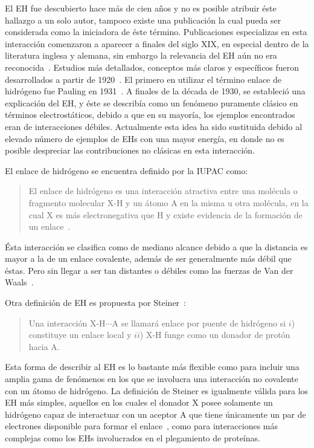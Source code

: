 El EH fue descubierto hace más de cien años y no es posible atribuir éste
hallazgo a un solo autor, tampoco existe una publicación la cual pueda ser
considerada como la iniciadora de éste término. Publicaciones especializas en
esta interacción comenzaron a aparecer a finales del siglo XIX, en especial
dentro de la literatura inglesa y alemana, sin embargo la relevancia del EH aún
no era reconocida~\cite{steiner}. Estudios más detallados, conceptos más claros
y específicos fueron desarrollados a partir de 1920~\cite{steiner}. El primero
en utilizar el término enlace de hidrógeno fue Pauling en 1931~\cite{gilli}.  A
finales de la década de 1930, se estableció una explicación del EH, y éste se
describía como un fenómeno puramente clásico en términos electrostáticos,
debido a que en su mayoría, los ejemplos encontrados eran de interacciones
débiles.  Actualmente esta idea ha sido sustituida debido al elevado número de
ejemplos de EHs con una mayor energía, en donde no es posible despreciar las
contribuciones no clásicas en esta interacción.

El enlace de hidrógeno se encuentra definido por la IUPAC como:

\begin{quote}
El enlace de hidrógeno es una interacción atractiva entre
una molécula o fragmento molecular X-H y un átomo A en la misma u
otra molécula, en la cual X es más electronegativa que H y existe 
evidencia de la formación de un enlace~\cite{iupac}.
\end{quote}

Ésta interacción se clasifica como de mediano alcance debido a que la distancia
es mayor a la de un enlace covalente, además de ser generalmente más débil que
éstas. Pero sin llegar a ser tan distantes o débiles como las fuerzas de Van
der Waals~\cite{chang}.

Otra definición de EH es propuesta por Steiner~\cite{steiner}:

\begin{quote} 
Una interacción X-H$\cdots$A se llamará enlace por puente de
hidrógeno si $i$) constituye un enlace local y $ii$) X-H funge como un
donador de protón hacia A.
\end{quote}

\noindent Esta forma de describir al EH es lo bastante más flexible como para
incluir una amplia gama de fenómenos en los que se involucra una interacción no
covalente con un átomo de hidrógeno. La definición de Steiner es igualmente
válida para los EH más simples, aquellos en los cuales el donador X posee
solamente un hidrógeno capaz de interactuar con un aceptor A que tiene
únicamente un par de electrones disponible para formar el
enlace~\cite{scheiner}, como para interacciones más complejas como los EHs
involucrados en el plegamiento de proteínas.


